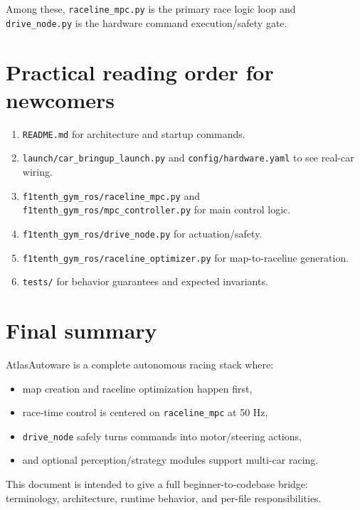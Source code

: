 \documentclass[11pt]{article}
\begin{document}
Among these, \texttt{raceline\_mpc.py} is the primary race logic loop and \texttt{drive\_node.py} is the hardware command execution/safety gate.

\section{Practical reading order for newcomers}
\begin{enumerate}
  \item \texttt{README.md} for architecture and startup commands.
  \item \texttt{launch/car\_bringup\_launch.py} and \texttt{config/hardware.yaml} to see real-car wiring.
  \item \texttt{f1tenth\_gym\_ros/raceline\_mpc.py} and \texttt{f1tenth\_gym\_ros/mpc\_controller.py} for main control logic.
  \item \texttt{f1tenth\_gym\_ros/drive\_node.py} for actuation/safety.
  \item \texttt{f1tenth\_gym\_ros/raceline\_optimizer.py} for map-to-raceline generation.
  \item \texttt{tests/} for behavior guarantees and expected invariants.
\end{enumerate}

\section{Final summary}
AtlasAutoware is a complete autonomous racing stack where:
\begin{itemize}
  \item map creation and raceline optimization happen first,
  \item race-time control is centered on \texttt{raceline\_mpc} at 50 Hz,
  \item \texttt{drive\_node} safely turns commands into motor/steering actions,
  \item and optional perception/strategy modules support multi-car racing.
\end{itemize}

This document is intended to give a full beginner-to-codebase bridge: terminology, architecture, runtime behavior, and per-file responsibilities.
\end{document}
